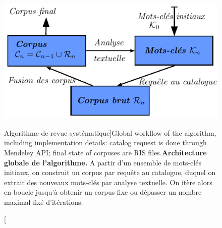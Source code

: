 \begin{figure}
\centering
\includegraphics[width=0.8\linewidth]{Figures/QuantEpistemo/schema_algo}
\caption[Systematic review algorithm workflow][Algorithme de revue systématique]{Global workflow of the algorithm, including implementation details: catalog request is done through Mendeley API; final state of corpuses are RIS files.\label{fig:quantepistemo:algo}}{\textbf{Architecture globale de l'algorithme.} A partir d'un ensemble de mots-clés initiaux, on construit un corpus par requête au catalogue, duquel on extrait des nouveaux mots-clés par analyse textuelle. On itère alors en boucle jusqu'à obtenir un corpus fixe ou dépasser un nombre maximal fixé d'itérations.\label{fig:quantepistemo:algo}}
\end{figure}







